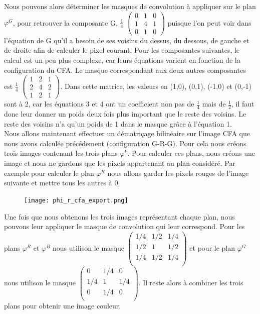 \documentclass[a4paper,11pt]{article}
\begin{document}
  Nous pouvons alors déterminer les masques de convolution à appliquer sur le plan $\varphi^G$,
  pour retrouver la composante G, $\frac{1}{4}$
  $\begin{pmatrix}
   0 & 1 & 0\\
   1 & 4 & 1\\
   0 & 1 & 0
  \end{pmatrix}$
  puisque l'on peut voir dans l'équation de G qu'il a besoin de ses voisins du dessus, du dessous,
  de gauche et de droite afin de calculer le pixel courant. Pour les composantes suivantes, le calcul
  est un peu plus complexe, car leurs équations varient en fonction de la configuration du CFA. Le masque
  correspondant aux deux autres composantes est $\frac{1}{4}$
  $\begin{pmatrix}
   1 & 2 & 1\\
   2 & 4 & 2\\
   1 & 2 & 1
  \end{pmatrix}$. Dans cette matrice, les valeurs en (1,0), (0,1), (-1,0) et (0,-1) sont à 2, car 
  les équations 3 et 4 ont un coefficient non pas de $\frac{1}{4}$ mais de $\frac{1}{2}$, il faut
  donc leur donner un poids deux fois plus important que le reste des voisins. Le reste des voisins n'a 
  qu'un poids de 1 dans le masque grâce à l'équation 1.\\
  
  Nous allons maintenant effectuer un dématriçage bilinéaire sur l'image CFA que nous avons calculée
  précédement (configuration G-R-G). Pour cela nous créons trois images contenant les trois plans $\varphi^k$.
  Pour calculer ces plans, nous créons une image et nous ne gardons que les pixels appartenant au plan considéré.
  Par exemple pour calculer le plan $\varphi^R$ nous allons garder les pixels rouges de l'image suivante et mettre tous 
  les autres à 0.
  
  \begin{figure}[H]
  \center
   \texttt{[image: phi\_r\_cfa\_export.png]}
  \end{figure}

  Une fois que nous obtenons les trois images représentant chaque plan, nous pouvons leur appliquer le masque de
  convolution qui leur correspond. Pour les plans $\varphi^R$ et $\varphi^B$ nous utilison le masque 
  $\begin{pmatrix}
    1/4 & 1/2 & 1/4\\
    1/2 & 1 & 1/2\\
    1/4 & 1/2 & 1/4\\
   \end{pmatrix}$ et pour le plan $\varphi^G$ nous utilison le masque 
   $\begin{pmatrix}
    0 & 1/4 & 0\\
    1/4 & 1 & 1/4\\
    0 & 1/4 & 0\\
   \end{pmatrix}$.
   Il reste alors à combiner les trois plans pour obtenir une image couleur.\\
   
\end{document}
